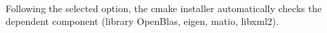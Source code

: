 \paragraph{}Following the selected option, the cmake installer automatically checks the dependent component (library OpenBlas, eigen, matio, libxml2).  




